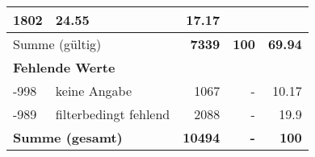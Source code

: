 \begin{longtable}{lXrrr}
       \num{1802} &
       \num[round-mode=places,round-precision=2]{24,55} &
         \num[round-mode=places,round-precision=2]{17,17} \\
     \midrule
     \multicolumn{2}{l}{Summe (gültig)} &
       \textbf{\num{7339}} &
     \textbf{100} &
       \textbf{\num[round-mode=places,round-precision=2]{69,94}} \\
     \multicolumn{5}{l}{\textbf{Fehlende Werte}}\\
       -998 &
       keine Angabe &
         \num{1067} &
        - &
         \num[round-mode=places,round-precision=2]{10,17} \\
       -989 &
       filterbedingt fehlend &
         \num{2088} &
        - &
         \num[round-mode=places,round-precision=2]{19,9} \\
     \midrule
     \multicolumn{2}{l}{\textbf{Summe (gesamt)}} &
          \textbf{\num{10494}} &
        \textbf{-} &
        \textbf{100} \\
     \bottomrule
     \end{longtable}
     
